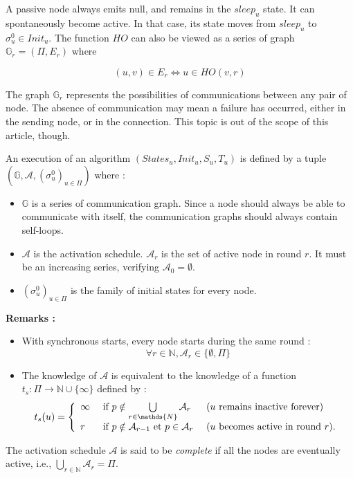 \documentclass{article}
\newcommand{\ts}{t_{s}}
\begin{document}
A passive node always emits null, and remains in the $sleep_u$ state.
It can spontaneously become active. In that case, its state moves from $sleep_u$ to $\sigma^0_u \in Init_u$.
The function $HO$ can also be viewed as a series of graph $\mathds{G}_r = (\Pi, E_r)$ where

$$(u, v) \in E_r \Leftrightarrow u \in HO(v, r)$$

The graph $\mathds{G}_r$ represents the possibilities of communications between any pair of node.
The absence of communication may mean a failure has occurred, either in the sending node, or in the connection.
This topic is out of the scope of this article, though.

An execution of an algorithm $(States_u, Init_u, S_u, T_u)$ is defined by a tuple
$(\mathds{G}, \mathcal{A}, (\sigma^0_u)_{u \in \Pi})$ where :

\begin{itemize}
	\item $\mathds{G}$ is a series of communication graph. Since a node should always be able to communicate 
		with itself, the communication graphs should always contain self-loops.
	\item $\mathcal{A}$ is the activation schedule. $\mathcal{A}_r$ is the set of active node in round $r$.
		It must be an increasing series, verifying $\mathcal{A}_0 = \emptyset$.
	\item $(\sigma^0_u)_{u \in \Pi}$ is the family of initial states for every node.
\end{itemize}

\textbf{Remarks :}

\begin{itemize}
	\item With synchronous starts, every node starts during the same round : 
		$$\forall r \in \mathds{N}, \mathcal{A}_r \in \{\emptyset, \Pi\}$$

	\item The knowledge of $\mathcal{A}$ is equivalent to the knowledge of a function
		$\ts : \Pi \rightarrow \mathds{N} \cup \{\infty\}$ defined by :
		$$\ts(u) = \left \{ \begin{array}{l ll}
		  \infty & \mbox{ if  } p \notin \bigcup\limits_{r \in \mathds{N}}  \mathcal{A}_r & 
			  \mbox { ($u$ remains inactive forever) } \\
		  r  & \mbox{ if  } p \notin \mathcal{A}_{r-1} \mbox{ et } p \in \mathcal{A}_{r}  &
			  \mbox{ ($u$ becomes active in round $r$)}.
		  \end{array} \right.$$

\end{itemize}
The activation schedule $\mathcal{A} $ is said to be \emph{complete} if all the nodes are eventually active,
	i.e., $ \bigcup\limits_{r \in \mathds{N}}  \mathcal{A}_r  = \Pi$.
\end{document}
